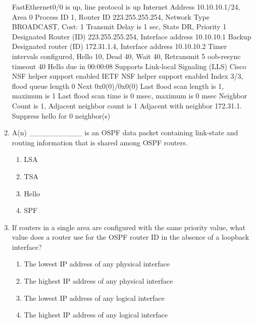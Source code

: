 \begin{enumerate}
\begin{cli}
FastEthernet0/0 is up, line protocol is up
  Internet Address 10.10.10.1/24, Area 0
  Process ID 1, Router ID 223.255.255.254, Network Type BROADCAST, Cost: 
1 Transmit Delay is 1 sec, State DR, Priority 1
  Designated Router (ID) 223.255.255.254, Interface address 10.10.10.1
Backup Designated router (ID) 172.31.1.4, Interface address 10.10.10.2
Timer intervals configured, Hello 10, Dead 40, Wait 40, Retransmit 5
    oob-resync timeout 40
    Hello due in 00:00:08
  Supports Link-local Signaling (LLS)
  Cisco NSF helper support enabled
  IETF NSF helper support enabled
  Index 3/3, flood queue length 0
  Next 0x0(0)/0x0(0)
  Last flood scan length is 1, maximum is 1
  Last flood scan time is 0 msec, maximum is 0 msec
  Neighbor Count is 1, Adjacent neighbor count is 1
    Adjacent with neighbor 172.31.1.  Suppress hello for 0 neighbor(s)
\end{cli}
\item
  A(n) \_\_\_\_\_\_\_\_\_\_ is an OSPF data packet containing link-state
  and routing information that is shared among OSPF routers.

  \begin{enumerate}
  \def\labelenumii{\Alph{enumii}.}
    \item
    LSA
  \item
    TSA
  \item
    Hello
  \item
    SPF
  \end{enumerate}
\item
  If routers in a single area are configured with the same priority
  value, what value does a router use for the OSPF router ID in the
  absence of a loopback interface?

  \begin{enumerate}
  \def\labelenumii{\Alph{enumii}.}
    \item
    The lowest IP address of any physical interface
  \item
    The highest IP address of any physical interface
  \item
    The lowest IP address of any logical interface
  \item
    The highest IP address of any logical interface
  \end{enumerate}
\end{enumerate}
